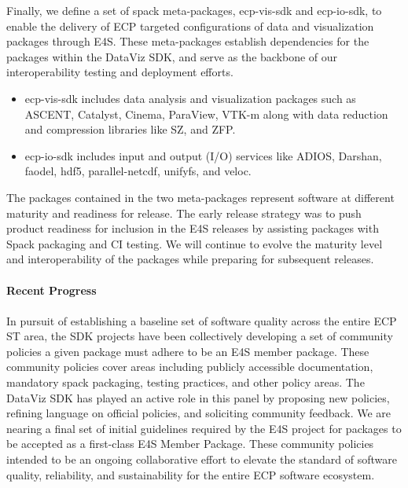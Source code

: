 Finally, we define a set of spack meta-packages, ecp-vis-sdk and ecp-io-sdk, to enable the delivery of ECP targeted configurations of data and visualization packages through E4S.  These meta-packages establish dependencies for the packages within the DataViz SDK, and serve as the backbone of our interoperability testing and deployment efforts. 

\begin{itemize}
\item ecp-vis-sdk includes data analysis and visualization packages such as ASCENT, Catalyst, Cinema, ParaView, VTK-m along with data reduction and compression libraries like SZ, and ZFP.
\item ecp-io-sdk includes input and output (I/O) services like ADIOS, Darshan, faodel, hdf5, parallel-netcdf, unifyfs, and veloc.
 \end{itemize}

\noindent
The packages contained in the two meta-packages represent software at different maturity and readiness for release. The early release strategy was to push product readiness for inclusion in the E4S releases by assisting packages with Spack packaging and CI testing. We will continue to evolve the maturity level and interoperability of the packages while preparing for subsequent releases.

\paragraph{\textbf{Recent Progress}}
\paragraph{}

In pursuit of establishing a baseline set of software quality across the entire ECP ST area, the SDK projects have been collectively developing a set of community policies a given package must adhere to be an E4S member package.  These community policies cover areas including publicly accessible documentation, mandatory spack packaging, testing practices, and other policy areas.  The DataViz SDK has played an active role in this panel by proposing new policies, refining language on official policies, and soliciting community feedback.  We are nearing a final set of initial guidelines required by the E4S project for packages to be accepted as a first-class E4S Member Package.  These community policies intended to be an ongoing collaborative effort to elevate the standard of software quality, reliability, and sustainability for the entire ECP software ecosystem.

